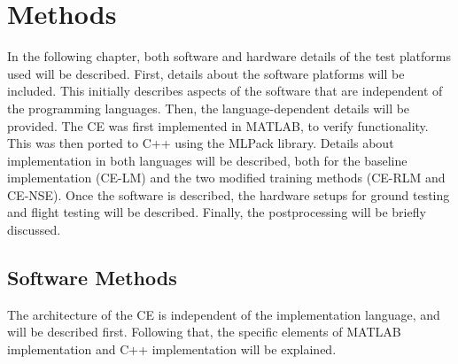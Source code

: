 \chapter{Methods}\label{ch:methods}
\par In the following chapter, both software and hardware details of the test platforms used will be described. First, details about the software platforms will be included. This initially describes aspects of the software that are independent of the programming languages. Then, the language-dependent details will be provided. The CE was first implemented in MATLAB, to verify functionality. This was then ported to C++ using the MLPack library. Details about implementation in both languages will be described, both for the baseline implementation (CE-LM) and the two modified training methods (CE-RLM and CE-NSE). Once the software is described, the hardware setups for ground testing and flight testing will be described. Finally, the postprocessing will be briefly discussed.

\section{Software Methods}
\par The architecture of the CE is independent of the implementation language, and will be described first. Following that, the specific elements of MATLAB implementation and C++ implementation will be explained.
